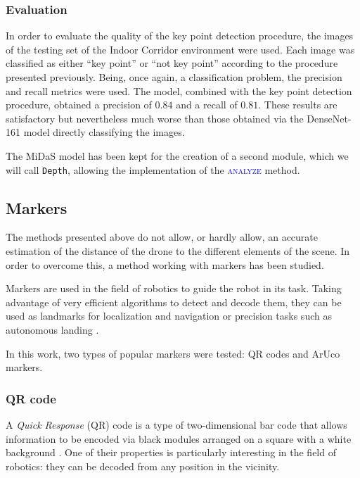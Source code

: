 \subsubsection{Evaluation}

In order to evaluate the quality of the key point detection procedure, the images of the testing set of the Indoor Corridor environment were used. Each image was classified as either \enquote{key point} or \enquote{not key point} according to the procedure presented previously. Being, once again, a classification problem, the precision and recall metrics were used. The model, combined with the key point detection procedure, obtained a precision of $\num{0.84}$ and a recall of $\num{0.81}$. These results are satisfactory but nevertheless much worse than those obtained via the DenseNet-161 model directly classifying the images.

The MiDaS model has been kept for the creation of a second module, which we will call \texttt{Depth}, allowing the implementation of the \textsc{\textcolor{blue}{analyze}} method.

\subsection{Markers}

The methods presented above do not allow, or hardly allow, an accurate estimation of the distance of the drone to the different elements of the scene. In order to overcome this, a method working with markers has been studied.

Markers are used in the field of robotics to guide the robot in its task. Taking advantage of very efficient algorithms to detect and decode them, they can be used as landmarks for localization and navigation \cite{zhang2015localization} or precision tasks such as autonomous landing \cite{fu2016autonomous}.

In this work, two types of popular markers were tested: QR codes and ArUco markers.

\subsubsection{QR code}

A \emph{Quick Response} (QR) code is a type of two-dimensional bar code that allows information to be encoded via black modules arranged on a square with a white background \cite{wikipedia2021qrcode}. One of their properties is particularly interesting in the field of robotics: they can be decoded from any position in the vicinity.

